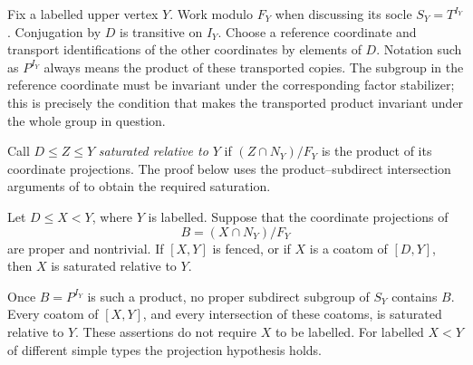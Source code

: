 Fix a labelled upper vertex $Y$. Work modulo $F_Y$ when discussing its
socle $S_Y=T^{I_Y}$. Conjugation by $D$ is transitive on $I_Y$.
Choose a reference coordinate and transport identifications of the other
coordinates by elements of $D$. Notation such as $P^{I_Y}$ always means
the product of these transported copies. The subgroup in the reference
coordinate must be invariant under the corresponding factor stabilizer;
this is precisely the condition that makes the transported product
invariant under the whole group in question.

Call $D\le Z\le Y$ \emph{saturated relative to $Y$} if
$(Z\cap N_Y)/F_Y$ is the product of its coordinate projections.
The proof below uses the product--subdirect intersection arguments of
\cite[Lemmas~2.12 and~2.13]{PalfyTwisted} to obtain the required saturation.

\begin{proposition}
\label{frm:strict-product}
Let $D\le X<Y$, where $Y$ is labelled. Suppose that the coordinate
projections of
\[
 B=(X\cap N_Y)/F_Y
\]
are proper and nontrivial. If $[X,Y]$ is fenced, or if $X$ is a coatom
of $[D,Y]$, then $X$ is saturated relative to $Y$.

Once $B=P^{I_Y}$ is such a product, no proper subdirect subgroup of
$S_Y$ contains $B$. Every coatom of $[X,Y]$, and every intersection
of these coatoms, is saturated relative to $Y$.
These assertions do not require $X$ to be labelled. For labelled
$X<Y$ of different simple types the projection hypothesis holds.
\end{proposition}

